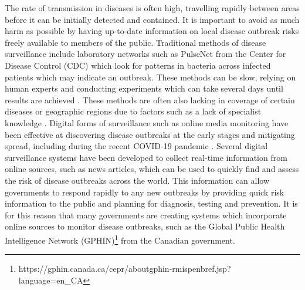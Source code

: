 \documentclass{l4proj}
\begin{document}
The rate of transmission in diseases is often high, travelling rapidly between areas before it can be initially detected and contained. It is important to avoid as much harm as possible by having up-to-date information on local disease outbreak risks freely available to members of the public. Traditional methods of disease surveillance include laboratory networks such as PulseNet from the Center for Disease Control (CDC) which look for patterns in bacteria across infected patients which may indicate an outbreak. These methods can be slow, relying on human experts and conducting experiments which can take several days until results are achieved \citep{swaminathan2001pulsenet}. These methods are often also lacking in coverage of certain diseases or geographic regions due to factors such as a lack of specialist knowledge \citep{abdulraheem2004disease}. Digital forms of surveillance such as online media monitoring have been effective at discovering disease outbreaks at the early stages and mitigating spread, including during the recent COVID-19 pandemic \citep{kostkova2021data}. Several digital surveillance systems have been developed to collect real-time information from online sources, such as news articles, which can be used to quickly find and assess the risk of disease outbreaks across the world. This information can allow governments to respond rapidly to any new outbreaks by providing quick risk information to the public and planning for diagnosis, testing and prevention. It is for this reason that many governments are creating systems which incorporate online sources to monitor disease outbreaks, such as the Global Public Health Intelligence Network (GPHIN)\footnote{https://gphin.canada.ca/cepr/aboutgphin-rmispenbref.jsp?language=en\_CA} from the Canadian government. \par
\end{document}
